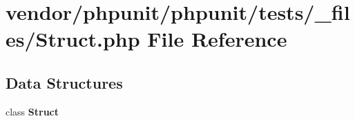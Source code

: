 \section{vendor/phpunit/phpunit/tests/\+\_\+files/\+Struct.php File Reference}
\label{phpunit_2phpunit_2tests_2__files_2_struct_8php}
\subsection*{Data Structures}
\begin{DoxyCompactItemize}
\item 
class {\bf Struct}
\end{DoxyCompactItemize}
